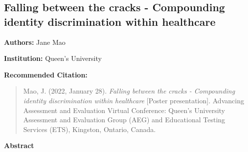 \documentclass[
]{book}
\begin{document}
\newpage

\hypertarget{falling-between-the-cracks---compounding-identity-discrimination-within-healthcare}{%
\subsection{Falling between the cracks - Compounding identity discrimination within healthcare}\label{falling-between-the-cracks---compounding-identity-discrimination-within-healthcare}}

\textbf{Authors:} Jane Mao

\textbf{Institution:} Queen's University

\textbf{Recommended Citation:}

\begin{quote}
Mao, J. (2022, January 28). \emph{Falling between the cracks - Compounding identity discrimination within healthcare} {[}Poster presentation{]}. Advancing Assessment and Evaluation Virtual Conference: Queen's University Assessment and Evaluation Group (AEG) and Educational Testing Services (ETS), Kingston, Ontario, Canada.
\end{quote}

\textbf{Abstract}
\end{document}
